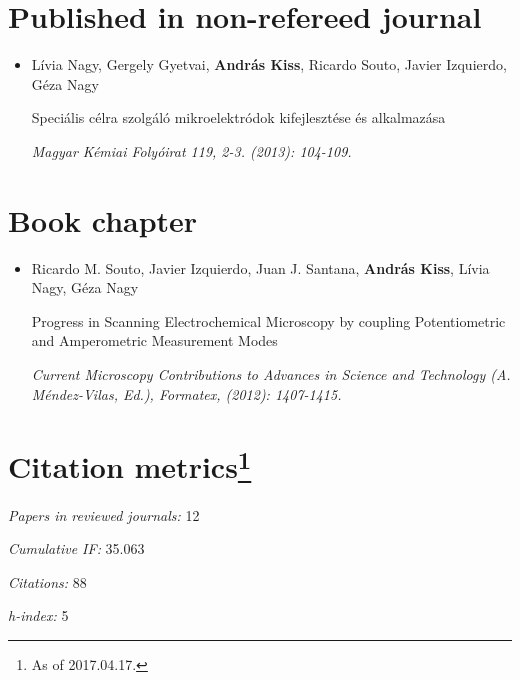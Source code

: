 \section*{Published in non-refereed journal}
\begin{itemize}

\item[] Lívia Nagy, Gergely Gyetvai, \textbf{András Kiss}, Ricardo Souto, Javier Izquierdo, Géza Nagy

Speciális célra szolgáló mikroelektródok kifejlesztése és alkalmazása

\emph{Magyar Kémiai Folyóirat 119, 2-3. (2013): 104-109.}
\end{itemize}

\section*{Book chapter}
\begin{itemize}

\item[] Ricardo M. Souto, Javier Izquierdo, Juan J. Santana, \textbf{András Kiss}, Lívia Nagy, Géza Nagy

Progress in Scanning Electrochemical Microscopy by coupling Potentiometric and Amperometric Measurement Modes

\emph{Current Microscopy Contributions to Advances in Science and Technology (A. Méndez-Vilas, Ed.), Formatex, (2012): 1407-1415.}
\end{itemize}

\section*{Citation metrics\footnote{As of 2017.04.17.}}
\emph{Papers in reviewed journals:} 12

\emph{Cumulative IF:} 35.063

\emph{Citations:} 88

\emph{h-index:} 5
